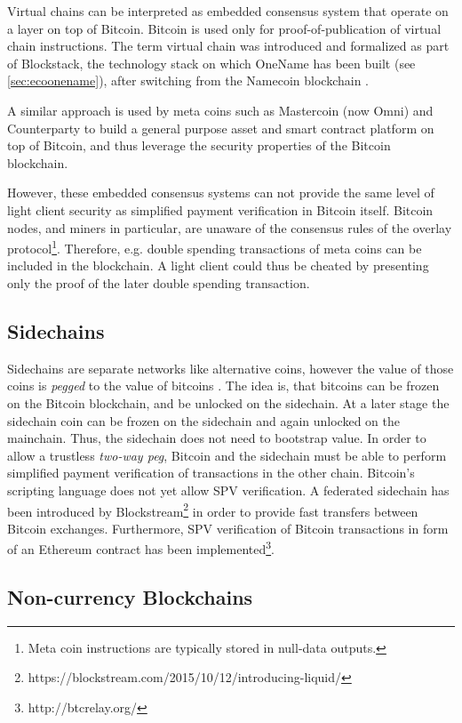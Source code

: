 Virtual chains can be interpreted as embedded consensus system that operate on a layer on top of Bitcoin. Bitcoin is used only for proof-of-publication of virtual chain instructions. The term virtual chain was introduced and formalized as part of Blockstack, the technology stack on which OneName has been built (see \ref{sec:ecoonename}), after switching from the Namecoin blockchain \parencite{ali2016blockstack}. 

A similar approach is used by meta coins such as Mastercoin (now Omni) and Counterparty to build a general purpose asset and smart contract platform on top of Bitcoin, and thus leverage the security properties of the Bitcoin blockchain. 

However, these embedded consensus systems can not provide the same level of light client security as simplified payment verification in Bitcoin itself. Bitcoin nodes, and miners in particular, are unaware of the consensus rules of the overlay protocol\footnote{Meta coin instructions are typically stored in null-data outputs.}. Therefore, e.g. double spending transactions of meta coins can be included in the blockchain. A light client could thus be cheated by presenting only the proof of the later double spending transaction.

\subsection{Sidechains}
Sidechains are separate networks like alternative coins, however the value of those coins is \emph{pegged} to the value of bitcoins \parencite{backenabling}. The idea is, that bitcoins can be frozen on the Bitcoin blockchain, and be unlocked on the sidechain. At a later stage the sidechain coin can be frozen on the sidechain and again unlocked on the mainchain. Thus, the sidechain does not need to bootstrap value.
In order to allow a trustless \emph{two-way peg}, Bitcoin and the sidechain must be able to perform simplified payment verification of transactions in the other chain. Bitcoin's scripting language does not yet allow SPV verification. A federated sidechain has been introduced by Blockstream\footnote{https://blockstream.com/2015/10/12/introducing-liquid/} in order to provide fast transfers between Bitcoin exchanges. Furthermore, SPV verification of Bitcoin transactions in form of an Ethereum contract has been implemented\footnote{http://btcrelay.org/}.

\subsection{Non-currency Blockchains}

